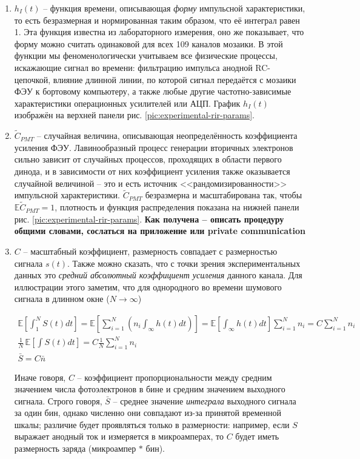 \documentclass[12pt]{book}
\begin{document}
	\begin{enumerate}
		\item $h_I(t)$ -- функция времени, описывающая \textit{форму} импульсной характеристики, то есть безразмерная и нормированная таким образом, что её интеграл равен 1. Эта функция известна из лабораторного измерения, оно же показывает, что форму можно считать одинаковой для всех 109 каналов мозаики. В этой функции мы феноменологически учитываем все физические процессы, искажающие сигнал во времени: фильтрацию импульса анодной RC-цепочкой, влияние длинной линии, по которой сигнал передаётся с мозаики ФЭУ к бортовому компьютеру, а также любые другие частотно-зависимые характеристики операционных усилителей или АЦП. График $h_I(t)$ изображён на верхней панели рис. \ref{pic:experimental-rir-params}.
		\item $\tilde{C}_{PMT}$ -- случайная величина, описывающая неопределённость коэффициента усиления ФЭУ. Лавинообразный процесс генерации вторичных электронов сильно зависит от случайных процессов, проходящих в области первого динода, и в зависимости от них коэффициент усиления также оказывается случайной величиной -- это и есть источник <<рандомизированности>> импульсной характеристики. $\tilde{C}_{PMT}$ безразмерна и масштабирована так, чтобы $\mathbb{E} \tilde{C}_{PMT} = 1$, плотность и функция распределения показана на нижней панели рис. \ref{pic:experimental-rir-params}. \textbf{Как получена -- описать процедуру общими словами, сослаться на приложение или private communication}
		\item $C$ -- масштабный коэффициент, размерность совпадает с размерностью сигнала $s(t)$. Также можно сказать, что с точки зрения экспериментальных данных это \textit{средний абсолютный коэффициент усиления} данного канала. Для иллюстрации этого заметим, что для однородного во времени шумового сигнала в длинном окне ($N \rightarrow \infty$)
		
		\begin{equation}
			\label{eq:C-coeff-description}
			\begin{gathered}
				\mathbb{E} \left[ \int_{1}^{N} S(t) dt \right] = \mathbb{E} \left[ \sum_{i=1}^{N} \left( n_i \int_{\infty} h(t) dt \right) \right] = \mathbb{E} \left[ \int_{\infty} h(t) dt \right] \sum_{i=1}^{N} n_i = C \sum_{i=1}^{N} n_i \\
				\frac{1}{N} \, \mathbb{E} \left[ \int S(t) dt \right] = C \frac{1}{N} \sum_{i=1}^{N} n_i \\
				\bar{S} = C \bar{n}
			\end{gathered}
		\end{equation}

		Иначе говоря, $C$ -- коэффициент пропорциональности между средним значением числа фотоэлектронов в бине и средним значением выходного сигнала. Строго говоря, $\bar{S}$ -- среднее значение \textit{интеграла} выходного сигнала за один бин, однако численно они совпадают из-за принятой временной шкалы; различие будет проявляться только в размерности: например, если $S$ выражает анодный ток и измеряется в микроамперах, то $C$ будет иметь размерность заряда (микроампер $*$ бин).

	\end{enumerate}
\end{document}
